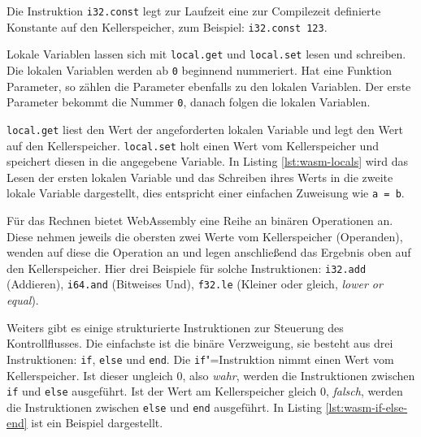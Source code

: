 Die Instruktion \lstinline{i32.const} legt zur Laufzeit eine zur Compilezeit definierte Konstante auf den Kellerspeicher, zum Beispiel: \lstinline{i32.const 123}.

Lokale Variablen lassen sich mit \lstinline{local.get} und \lstinline{local.set} lesen und schreiben. Die lokalen Variablen werden ab \lstinline{0} beginnend nummeriert. Hat eine Funktion Parameter, so zählen die Parameter ebenfalls zu den lokalen Variablen. Der erste Parameter bekommt die Nummer \lstinline{0}, danach folgen die lokalen Variablen.

\lstinline{local.get} liest den Wert der angeforderten lokalen Variable und legt den Wert auf den Kellerspeicher. \lstinline{local.set} holt einen Wert vom Kellerspeicher und speichert diesen in die angegebene Variable. In Listing \ref{lst:wasm-locals} wird das Lesen der ersten lokalen Variable und das Schreiben ihres Werts in die zweite lokale Variable dargestellt, dies entspricht einer einfachen Zuweisung wie \lstinline{a = b}. 



Für das Rechnen bietet WebAssembly eine Reihe an binären Operationen an. Diese nehmen jeweils die obersten zwei Werte vom Kellerspeicher (Operanden), wenden auf diese die Operation an und legen anschließend das Ergebnis oben auf den Kellerspeicher. Hier drei Beispiele für solche Instruktionen: \lstinline{i32.add} (Addieren), \lstinline{i64.and} (Bitweises Und), \lstinline{f32.le} (Kleiner oder gleich, \emph{lower or equal}).

Weiters gibt es einige strukturierte Instruktionen zur Steuerung des Kontrollflusses. Die einfachste ist die binäre Verzweigung, sie besteht aus drei Instruktionen: \lstinline{if}, \lstinline{else} und \lstinline{end}. Die \lstinline{if}"=Instruktion nimmt einen Wert vom Kellerspeicher. Ist dieser ungleich 0, also \emph{wahr}, werden die Instruktionen zwischen \lstinline{if} und \lstinline{else} ausgeführt. Ist der Wert am Kellerspeicher gleich 0, \emph{falsch}, werden die Instruktionen zwischen \lstinline{else} und \lstinline{end} ausgeführt. In Listing \ref{lst:wasm-if-else-end} ist ein Beispiel dargestellt.



